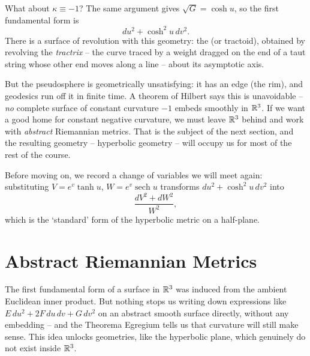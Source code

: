 \documentclass[a4paper]{scrartcl}
\begin{document}
What about $\kappa \equiv -1$? The same argument gives $\sqrt{G} = \cosh u$, so the first fundamental form is
$$
du^2 + \cosh^2 u \, dv^2.
$$
There is a surface of revolution with this geometry: the  (or tractoid), obtained by revolving the \emph{tractrix} -- the curve traced by a weight dragged on the end of a taut string whose other end moves along a line -- about its asymptotic axis.
\begin{center}
\end{center}
But the pseudosphere is geometrically unsatisfying: it has an edge (the rim), and geodesics run off it in finite time. A theorem of Hilbert says this is unavoidable -- \emph{no} complete surface of constant curvature $-1$ embeds smoothly in $\mathbb{R}^3$. If we want a good home for constant negative curvature, we must leave $\mathbb{R}^3$ behind and work with \emph{abstract} Riemannian metrics. That is the subject of the next section, and the resulting geometry -- hyperbolic geometry -- will occupy us for most of the rest of the course.

Before moving on, we record a change of variables we will meet again: substituting $V = e^{v}\tanh u$, $W = e^{v}\operatorname{sech} u$ transforms $du^2 + \cosh^2 u \, dv^2$ into
$$
\frac{dV^2 + dW^2}{W^2},
$$
which is the `standard' form of the hyperbolic metric on a half-plane.

\section{Abstract Riemannian Metrics}\label{sec:riemannianmetrics}

The first fundamental form of a surface in $\mathbb{R}^3$ was induced from the ambient Euclidean inner product. But nothing stops us writing down expressions like $E\,du^2 + 2F\,du\,dv + G\,dv^2$ on an abstract smooth surface directly, without any embedding -- and the Theorema Egregium tells us that curvature will still make sense. This idea unlocks geometries, like the hyperbolic plane, which genuinely do not exist inside $\mathbb{R}^3$.
\end{document}
